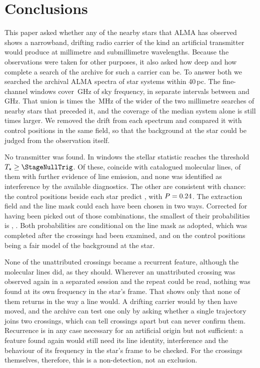 \section{Conclusions}
\label{sec:conclusions}

This paper asked whether any of the nearby stars that ALMA has observed shows
a narrowband, drifting radio carrier of the kind an artificial transmitter
would produce at millimetre and submillimetre wavelengths. Because the
observations were taken for other purposes, it also asked how deep and how
complete a search of the archive for such a carrier can be. To answer both
we searched the archival ALMA spectra of \NSysClassA{} star systems within
40\,pc. The fine-channel windows cover \CvUnionA\,GHz of sky frequency, in
\CovNIslands{} separate intervals between \SurvFreqLoA{} and
\SurvFreqHiA\,GHz. That union is \SbPriorRatio{} times the \SbPriorBandMHz\,MHz of the
wider of the two millimetre searches of nearby stars that preceded it, and
the coverage of the median system alone is still \SbPriorRatioSysMed{}
times larger. We removed the drift from each spectrum and compared it with
control positions in the same field, so that the background at the star
could be judged from the observation itself.

No transmitter was found. In \CsNCross{} windows the stellar statistic reaches
the threshold $T_\star\geq\StageNullTrig$. Of these, \MkNCoinc{} coincide with
catalogued molecular lines, \LnAttrSupp{} of them with further evidence of
line emission, and none was identified as interference by the available
diagnostics. The other \CeObs{} are consistent with chance: the
control positions beside each star predict \CeExp, with $P=0.24$. The extraction field and the line
mask could each have been chosen in two ways. Corrected for having been
picked out of those \CgNTrialWord{} combinations, the smallest of their
probabilities is \CgBonfProb, \CgVerdictClause. Both probabilities are conditional on the line mask as adopted, which was completed
after the crossings had been examined, and on the control positions being a
fair model of the background at the star.

None of the unattributed crossings became a recurrent feature, although
the molecular lines did, as they should. Wherever an unattributed
crossing was observed again in a separated session and the repeat could be
read, nothing was found at its own frequency in the star's frame. That shows
only that none of them returns in the way a line would. A drifting carrier
would by then have moved, and the archive can test one only by asking
whether a single trajectory joins two crossings, which can tell crossings
apart but can never confirm them. Recurrence is in any case necessary for an
artificial origin but not sufficient: a feature found again would still need
its line identity, interference and the behaviour of its frequency in the
star's frame to be checked. For the crossings themselves, therefore,
this is a non-detection, not an exclusion.

